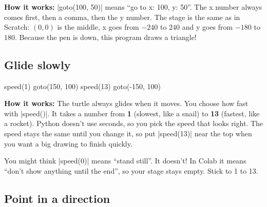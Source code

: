 \textbf{How it works:} \py|goto(100, 50)| means ``go to x: 100, y: 50''. The x number always comes first, then a comma, then the y number. The stage is the same as in Scratch: $(0, 0)$ is the middle, x goes from $-240$ to $240$ and y goes from $-180$ to $180$. Because the pen is down, this program draws a triangle!

\subsection*{Glide slowly}

\begin{tcbraster}[raster columns=2, raster equal height=rows, raster column skip=12pt, raster valign=center]
\begin{tcolorbox}[colback=white, colframe=white, boxrule=0pt, valign=center]
\begin{scratch}
\end{scratch}
\end{tcolorbox}
\begin{code}
speed(1)
goto(150, 100)
speed(13)
goto(-150, 100)
\end{code}
\end{tcbraster}

\textbf{How it works:} The turtle always glides when it moves. You choose how fast with \py|speed()|. It takes a number from \textbf{1} (slowest, like a snail) to \textbf{13} (fastest, like a rocket). Python doesn't use seconds, so you pick the speed that looks right. The speed stays the same until you change it, so put \py|speed(13)| near the top when you want a big drawing to finish quickly.

\begin{watchout}
You might think \py|speed(0)| means ``stand still''. It doesn't! In Colab it means ``don't show anything until the end'', so your stage stays empty. Stick to 1 to 13.
\end{watchout}

\subsection*{Point in a direction}


